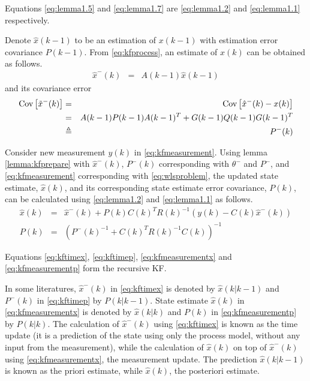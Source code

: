 \begin{lemma}
	Equations \eqref{eq:lemma1.5} and \eqref{eq:lemma1.7} are \eqref{eq:lemma1.2} and \eqref{eq:lemma1.1} respectively.
	
\end{lemma}

Denote $\hat{x}(k-1)$ to be an estimation of $x(k-1)$ with estimation error covariance $P(k-1)$. From \eqref{eq:kfprocess}, an estimate of $x(k)$ can be obtained as follows.
\begin{eqnarray}
	\hat{x}^-(k) &=& A(k-1)\hat{x}(k-1) \label{eq:kftimex}
\end{eqnarray}
and its covariance error
\begin{eqnarray}
	\textup{Cov}\left[\tilde{x}^-(k)\right] &=& \textup{Cov}\left[\hat{x}^-(k) - x(k)\right] \nonumber \\
	&=& A(k-1)P(k-1)A(k-1)^T + G(k-1)Q(k-1)G(k-1)^T \nonumber \\
	&\triangleq& P^-(k) \label{eq:kftimep}
\end{eqnarray}

Consider new measurement $y(k)$ in \eqref{eq:kfmeasurement}. Using lemma \ref{lemma:kfprepare} with $\hat{x}^-(k)$, $P^-(k)$ corresponding with $\theta^-$ and $P^-$, and \eqref{eq:kfmeasurement} corresponding with \eqref{eq:wlsproblem}, the updated state estimate, $\hat{x}(k)$, and its corresponding state estimate error covariance, $P(k)$, can be calculated using \eqref{eq:lemma1.2} and \eqref{eq:lemma1.1} as follows.
\begin{eqnarray}
	\hat{x}(k) &=& \hat{x}^-(k) + P(k)C(k)^TR(k)^{-1}\left(y(k)-C(k)\hat{x}^-(k)\right) \label{eq:kfmeasurementx} \\
	P(k) &=& \left({P^-(k)}^{-1} + C(k)^TR(k)^{-1}C(k)\right)^{-1} \label{eq:kfmeasurementp}
\end{eqnarray}

Equations \eqref{eq:kftimex}, \eqref{eq:kftimep}, \eqref{eq:kfmeasurementx} and \eqref{eq:kfmeasurementp} form the recursive KF.

In some literatures, $\hat{x}^-(k)$ in \eqref{eq:kftimex} is denoted by $\hat{x}(k|k-1)$ and $P^-(k)$ in \eqref{eq:kftimep} by $P(k|k-1)$. State estimate $\hat{x}(k)$ in \eqref{eq:kfmeasurementx} is denoted by $\hat{x}(k|k)$ and $P(k)$ in \eqref{eq:kfmeasurementp} by $P(k|k)$. The calculation of $\hat{x}^-(k)$ using \eqref{eq:kftimex} is known as the time update (it is a prediction of the state using only the process model, without any input from the measurement), while the calculation of $\hat{x}(k)$ on top of $\hat{x}^-(k)$ using \eqref{eq:kfmeasurementx}, the measurement update. The prediction  $\hat{x}(k|k-1)$ is known as the priori estimate, while $\hat{x}(k)$, the posteriori estimate.

